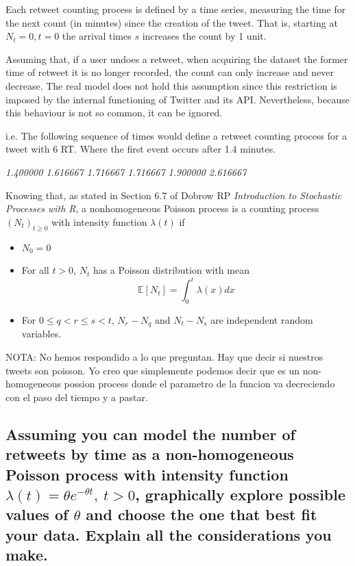 Each retweet counting process is defined by a time series, measuring the time for the next count (in minutes) since the creation of the tweet. 
That is, starting at $N_t=0, t=0$ the arrival times $s$ increases the count by 1 unit.

Assuming that, if a user undoes a retweet, when acquiring the dataset the former time of retweet it is no longer recorded, the count can only increase and never decrease. 
The real model does not hold this assumption since this restriction is imposed by the internal functioning of Twitter and its API. 
Nevertheless, because this behaviour is not so common, it can be ignored.

i.e. The following sequence of times would define a retweet counting process for a tweet with 6 RT. 
Where the first event occurs after 1.4 minutes.

\begin{center}
\textit{1.400000    1.616667    1.716667    1.716667    1.900000    2.616667}
\end{center}

Knowing that, as stated in Section 6.7 of Dobrow RP \textit{Introduction to Stochastic Processes with R}, a nonhomogeneous Poisson process is a counting process $(N_t)_{t\geq0}$ with intensity function $\lambda(t)$ if
\begin{itemize}
	\item $N_0 = 0$ 
	\item For all $t>0$, $N_t$ has a Poisson distribution with mean
	\[\mathbb{E}[N_t] = \int^t_0\lambda(x)dx\]
	\item For $0\leq q < r \leq s < t$, $N_r - N_q$ and $N_t - N_s$ are independent random variables.
\end{itemize}

NOTA: No hemos respondido a lo que preguntan. Hay que decir si nuestros tweets son poisson. Yo creo que simplemente podemos decir que es un non-homogeneous possion process donde el parametro de la funcion va decreciendo con el paso del tiempo y a pastar.


\subsection{Assuming you can model the number of retweets by time as a non-homogeneous Poisson process with intensity function $ \lambda (t) = \theta e^{-\theta t},\ t>0$, graphically explore possible values of $\theta$ and choose the one that best fit your data. Explain all the considerations you make.}

